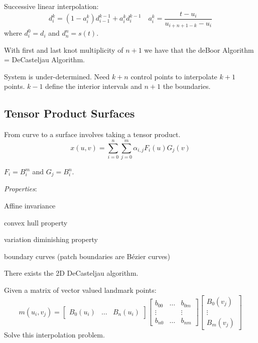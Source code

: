 \begin{algorithm}
  Successive linear interpolation:
  \[d_i^k = (1 - a_i^k)d_{i-1}^{k-1} + a_i^k d_i^{k-1} \quad a_i^k = \frac{t - u_i}{u_{i+n+1-k} - u_i}\]
  where \(d_i^0 = d_i\) and \(d_n^n = s(t)\).
\end{algorithm}

\begin{theorem}
  With first and last knot multiplicity of \(n+1\) we have that the deBoor Algorithm = DeCasteljau Algorithm.
\end{theorem}

\begin{definition}
  System is under-determined. Need \(k+n\) control points to interpolate \(k+1\) points. \(k-1\) define the interior intervals and \(n+1\) the boundaries.
\end{definition}

\subsection{Tensor Product Surfaces}
From curve to a surface involves taking a tensor product.
\[x(u, v) = \sum_{i=0}^{n}\sum_{j=0}^{m}\alpha_{i, j} F_i(u)G_j(v)\]

\begin{definition}
  \(F_i = B_i^m\) and \(G_j = B_i^n\).

  \textit{Properties}:
  \begin{itemize*}
    \item Affine invariance
    \item convex hull property
    \item variation diminishing property
    \item boundary curves (patch boundaries are Bézier curves)
  \end{itemize*}
\end{definition}

\begin{algorithm}[2D DeCasteljau]
  There exists the 2D DeCasteljau algorithm.
\end{algorithm}

\begin{definition}
  Given a matrix of vector valued landmark points:
  \[m(u_i, v_j) = \begin{bmatrix}
    B_0(u_i) & \ldots & B_n(u_i)
  \end{bmatrix} \begin{bmatrix}
    b_{00} & \ldots & b_{0m} \\ \vdots && \vdots \\ b_{n0} & \ldots & b_{nm}
  \end{bmatrix} \begin{bmatrix}
    B_0(v_j) \\ \vdots \\ B_m(v_j)
  \end{bmatrix}\]
  Solve this interpolation problem.
\end{definition}

